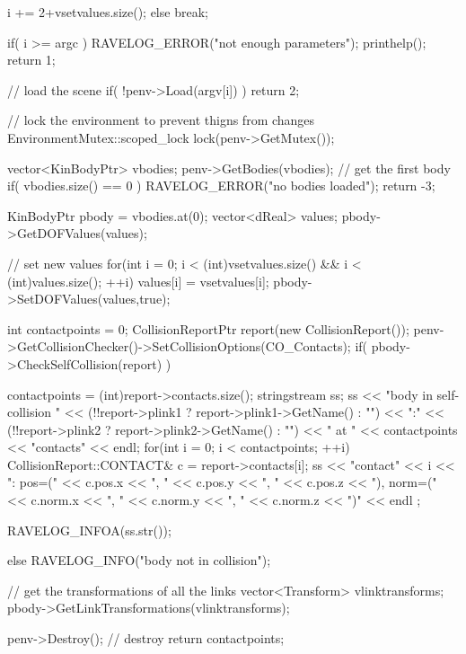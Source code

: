 \begin{DoxyCodeInclude}
{{{            i += 2+vsetvalues.size();
        }
        else
            break;
    }

    if( i >= argc ) {
        RAVELOG_ERROR("not enough parameters\n");
        printhelp();
        return 1;
    }

    // load the scene
    if( !penv->Load(argv[i]) ) {
        return 2;
    }

    // lock the environment to prevent thigns from changes
    EnvironmentMutex::scoped_lock lock(penv->GetMutex());

    vector<KinBodyPtr> vbodies;
    penv->GetBodies(vbodies);
    // get the first body
    if( vbodies.size() == 0 ) {
        RAVELOG_ERROR("no bodies loaded\n");
        return -3;
    }

    KinBodyPtr pbody = vbodies.at(0);
    vector<dReal> values;
    pbody->GetDOFValues(values);

    // set new values
    for(int i = 0; i < (int)vsetvalues.size() && i < (int)values.size(); ++i) {
        values[i] = vsetvalues[i];
    }
    pbody->SetDOFValues(values,true);

    int contactpoints = 0;
    CollisionReportPtr report(new CollisionReport());
    penv->GetCollisionChecker()->SetCollisionOptions(CO_Contacts);
    if( pbody->CheckSelfCollision(report) ) {
        contactpoints = (int)report->contacts.size();
        stringstream ss;
        ss << "body in self-collision "
           << (!!report->plink1 ? report->plink1->GetName() : "") << ":"
           << (!!report->plink2 ? report->plink2->GetName() : "") << " at "
           << contactpoints << "contacts" << endl;
        for(int i = 0; i < contactpoints; ++i) {
            CollisionReport::CONTACT& c = report->contacts[i];
            ss << "contact" << i << ": pos=("
               << c.pos.x << ", " << c.pos.y << ", " << c.pos.z << "), norm=("
               << c.norm.x << ", " << c.norm.y << ", " << c.norm.z << ")" << endl
      ;
        }

        RAVELOG_INFOA(ss.str());
    }
    else {
        RAVELOG_INFO("body not in collision\n");
    }

    // get the transformations of all the links
    vector<Transform> vlinktransforms;
    pbody->GetLinkTransformations(vlinktransforms);

    penv->Destroy(); // destroy
    return contactpoints;
}
\end{DoxyCodeInclude}
 